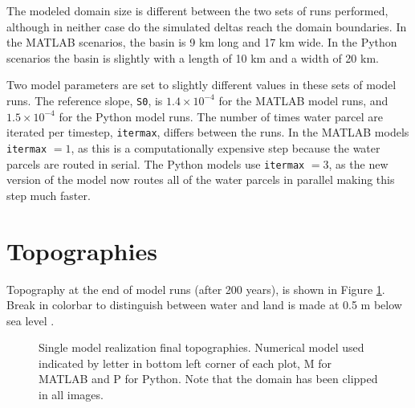 \documentclass[a4paper]{article}
\begin{document}
The modeled domain size is different between the two sets of runs performed, although in neither case do the simulated deltas reach the domain boundaries.
In the MATLAB scenarios, the basin is 9 km long and 17 km wide.
In the Python scenarios the basin is slightly with a length of 10 km and a width of 20 km.

Two model parameters are set to slightly different values in these sets of model runs.
The reference slope, \texttt{S0}, is $1.4 \times 10^{-4}$ for the MATLAB model runs, and $1.5 \times 10^{-4}$ for the Python model runs.
The number of times water parcel are iterated per timestep, \texttt{itermax}, differs between the runs.
In the MATLAB models \texttt{itermax} $=1$, as this is a computationally expensive step because the water parcels are routed in serial.
The Python models use \texttt{itermax} $=3$, as the new version of the model now routes all of the water parcels in parallel making this step much faster. 

\section{Topographies}
Topography at the end of model runs (after 200 years), is shown in Figure \ref{fig:finaltopo}.
Break in colorbar to distinguish between water and land is made at 0.5 m below sea level \cite{Liang2016a, Liang2016}.

\begin{figure}[!ht]
	\caption{Single model realization final topographies. Numerical model used indicated by letter in bottom left corner of each plot, M for MATLAB and P for Python. Note that the domain has been clipped in all images.}
	\label{fig:finaltopo}
\end{figure}
\end{document}
